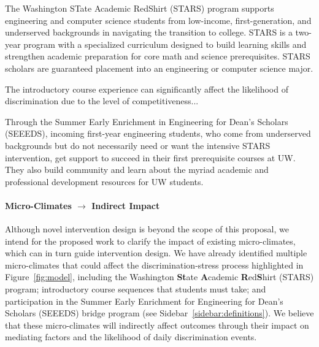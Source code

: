\begin{WrapText}
\begin{description}[leftmargin=1cm]
\item[STARS] The Washington {ST}ate Academic RedShirt (STARS) program supports engineering and computer science students from low-income, first-generation, and underserved backgrounds in navigating the transition to college.
STARS is a two-year program with a specialized curriculum designed to build learning skills and strengthen academic preparation for core math and science prerequisites. STARS scholars are guaranteed placement into an engineering or computer science major.

\item[Introductory Sequence] The introductory course experience can significantly affect the likelihood of discrimination due to the level of competitiveness...
\item[SEEEDS Bridge Program] Through the Summer Early Enrichment in Engineering for Dean's Scholars (SEEEDS), incoming first-year engineering students, who come from underserved backgrounds but do not necessarily need or want the intensive STARS intervention, get support to succeed in their first prerequisite courses at UW.  They also build community and learn about the myriad academic and professional development resources for UW students. 
\item[FIGS?]
\end{description}
\end{WrapText}

 \paragraph{Micro-Climates $\rightarrow$ Indirect Impact} Although novel intervention design is beyond the scope of this proposal, we intend for the proposed work to clarify the impact of existing micro-climates, which can in turn guide intervention design. We have already identified multiple micro-climates that could affect the discrimination-stress process highlighted in Figure~\ref{fig:model}, including the Washington \textbf{St}ate \textbf{A}cademic \textbf{R}ed\textbf{S}hirt (STARS) program; introductory course sequences that students must take; and participation in the Summer Early Enrichment for Engineering for Dean's Scholars (SEEEDS) bridge program (see Sidebar~\ref{sidebar:definitions}).  We believe that these micro-climates will indirectly affect outcomes through their impact on mediating factors and the likelihood of daily discrimination events. 
 
